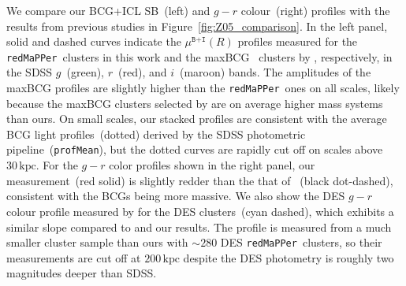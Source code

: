 \documentclass[fleqn,usenatbib]{mnras}
\newcommand{\mubi}{\mu^{\texttt{B+I}}}
\newcommand{\kpc}{\mathrm{kpc}}
\newcommand\redmapper{\texttt{redMaPPer}}
\begin{document}
We compare our BCG+ICL SB~(left) and $g{-}r$ colour~(right) profiles with
the results from previous studies in Figure~\ref{fig:Z05_comparison}. In
the left panel, solid and dashed curves indicate the $\mubi(R)$ profiles
measured for the \redmapper~clusters in this work and the
maxBCG~\citep{Koester2007} clusters by ,
respectively, in the SDSS $g$~(green), $r$~(red), and $i$~(maroon) bands.
The amplitudes of the maxBCG profiles are slightly higher than the
\redmapper~ones on all scales, likely because the maxBCG clusters selected
by  are on average higher mass systems than ours.
On small scales, our stacked profiles are consistent with the average BCG
light profiles~(dotted) derived by the SDSS photometric
pipeline~(\texttt{profMean}), but the dotted curves are rapidly cut off on
scales above $30\,\kpc$.  For the $g{-}r$ color profiles shown in the right
panel, our measurement~(red solid) is slightly redder than the that of
~(black dot-dashed), consistent with the
 BCGs being more massive. We also show the DES
$g{-}r$ colour profile measured by \citet{Zhang2019}  for the DES
clusters~(cyan dashed), which exhibits a similar slope compared to
 and our results. The \citeauthor{Zhang2019}
profile is measured from a much smaller cluster sample than ours with
${\sim}280$ DES \redmapper~clusters, so their measurements are cut off at
$200\,\kpc$ despite the DES photometry is roughly two magnitudes deeper
than SDSS.
\end{document}
